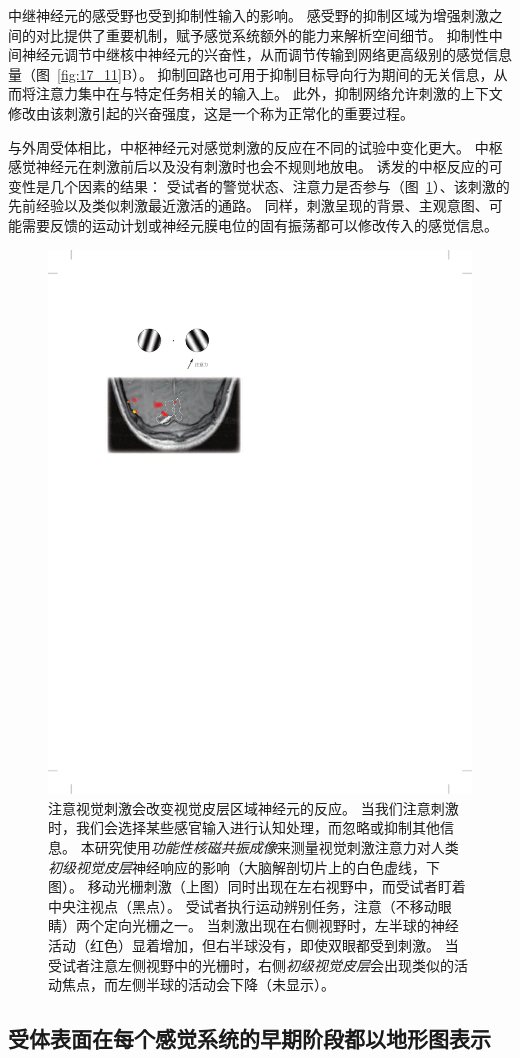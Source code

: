 中继神经元的感受野也受到抑制性输入的影响。 
感受野的抑制区域为增强刺激之间的对比提供了重要机制，赋予感觉系统额外的能力来解析空间细节。 
抑制性中间神经元调节中继核中神经元的兴奋性，从而调节传输到网络更高级别的感觉信息量（图~\ref{fig:17_11}B）。 
抑制回路也可用于抑制目标导向行为期间的无关信息，从而将注意力集中在与特定任务相关的输入上。 
此外，抑制网络允许刺激的上下文修改由该刺激引起的兴奋强度，这是一个称为正常化的重要过程。


与外周受体相比，中枢神经元对感觉刺激的反应在不同的试验中变化更大。 
中枢感觉神经元在刺激前后以及没有刺激时也会不规则地放电。 
诱发的中枢反应的可变性是几个因素的结果：
受试者的警觉状态、注意力是否参与（图~\ref{fig:17_12}）、该刺激的先前经验以及类似刺激最近激活的通路。 
同样，刺激呈现的背景、主观意图、可能需要反馈的运动计划或神经元膜电位的固有振荡都可以修改传入的感觉信息。


\begin{figure}[htbp]
	\centering
	\includegraphics[width=0.5\linewidth]{chap17/fig_17_12}
	\caption{注意视觉刺激会改变视觉皮层区域神经元的反应。 
		当我们注意刺激时，我们会选择某些感官输入进行认知处理，而忽略或抑制其他信息。
		本研究使用\textit{功能性核磁共振成像}来测量视觉刺激注意力对人类\textit{初级视觉皮层}神经响应的影响（大脑解剖切片上的白色虚线，下图）。 
		移动光栅刺激（上图）同时出现在左右视野中，而受试者盯着中央注视点（黑点）。 
		受试者执行运动辨别任务，注意（不移动眼睛）两个定向光栅之一。 
		当刺激出现在右侧视野时，左半球的神经活动（红色）显着增加，但右半球没有，即使双眼都受到刺激。 
		当受试者注意左侧视野中的光栅时，右侧\textit{初级视觉皮层}会出现类似的活动焦点，而左侧半球的活动会下降（未显示）\cite{gandhi1999spatial}。}
	\label{fig:17_12}
\end{figure}


\subsection{受体表面在每个感觉系统的早期阶段都以地形图表示}

